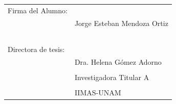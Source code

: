 \documentclass[12pt]{article}
\begin{document}
    \begin{tabular}{@{}p{6cm}p{7cm}@{}}
        \Large{Firma del Alumno:} & \hrulefill \\
        & \large{Jorge Esteban Mendoza Ortiz} \par \\
        \\    \\    \\    \\    \\    
        \Large{Directora de tesis:} & \hrulefill \\
        & \large{Dra. Helena Gómez Adorno} \\
        \Large{} & \\
        & \large{Investigadora Titular A} \\
        \Large{} &  \\
        & \large{IIMAS-UNAM} \\
        
    \end{tabular}
    
    
\end{document}
